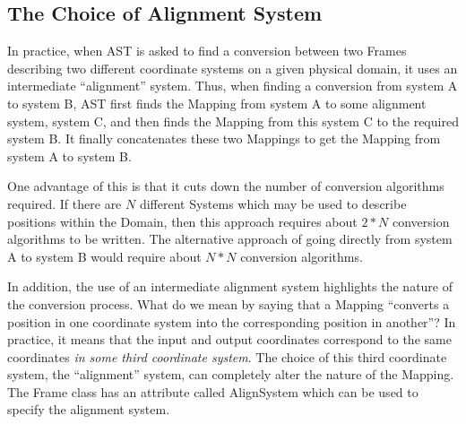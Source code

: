 \documentclass[twoside,11pt]{starlink}
\providecommand{\secref}[1]{\S\ref{#1}}
\begin{document}
%
%

\subsection{\label{ss:alignmentsystem}The Choice of Alignment System}

In practice, when AST is asked to find a conversion between two Frames
describing two different coordinate systems on a given physical domain,
it uses an intermediate ``alignment'' system. Thus, when finding a
conversion from system A to system B, AST first finds the Mapping from
system A to some alignment system, system C, and then finds the Mapping
from this system C to the required system B. It finally concatenates
these two Mappings to get the Mapping from system A to system B.

One advantage of this is that it cuts down the number of conversion
algorithms required. If there are $N$ different Systems which may be used
to describe positions within the Domain, then this approach requires
about $2*N$ conversion algorithms to be written. The alternative approach
of going directly from system A to system B would require about $N*N$
conversion algorithms.

In addition, the use of an intermediate alignment system highlights the
nature of the conversion process. What do we mean by saying that a
Mapping ``converts a position in one coordinate system into the
corresponding position in another''? In practice, it means that the input
and output coordinates correspond to the same coordinates \emph{in some
third coordinate system}. The choice of this third coordinate system, the
``alignment'' system, can completely alter the nature of the Mapping. The
Frame class has an attribute called AlignSystem which can be used to
specify the alignment system.
\end{document}
